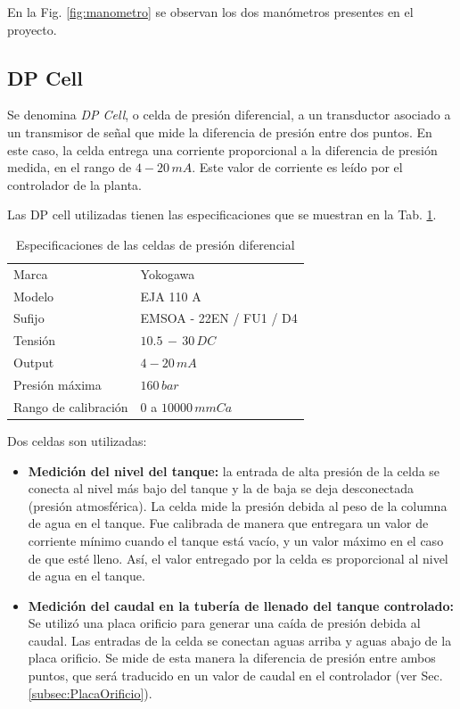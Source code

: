 En la Fig. \ref{fig:manometro} se observan los dos manómetros
presentes en el proyecto.

\subsection{DP Cell}
\label{subsec:DPCell}

Se denomina \textit{DP Cell}, o celda de presión diferencial, a un transductor
asociado a un transmisor de señal
que mide la diferencia de presión entre dos puntos.
En este caso, la celda entrega una corriente proporcional a la diferencia de
presión medida, en el rango de $4-20\,mA$.
Este valor de corriente es leído por el controlador de la planta.

Las DP cell utilizadas tienen las especificaciones que se muestran en la Tab.
\ref{tab:caractDPcell}.

\begin{table}[ht]
\renewcommand{\arraystretch}{1.3}
\centering
\begin{tabular}{|l|l|}
\hline
Marca & Yokogawa\\
Modelo & EJA 110 A\\
Sufijo & EMSOA - 22EN / FU1 / D4\\
Tensión & $10.5\,-\,30 \, DC$\\
Output & $4-20\,mA$\\
Presión máxima & $160\,bar$\\
Rango de calibración & $0$ a $10000\,mmCa$\\
\hline
\end{tabular}
\caption{Especificaciones de las celdas de presión diferencial}
\label{tab:caractDPcell}
\end{table}

Dos celdas son utilizadas:
\begin{itemize}
 \item \textbf{Medición del nivel del tanque:} la entrada de alta presión de la
celda
se conecta  al nivel más bajo del tanque y la de baja se deja desconectada
(presión atmosférica).
La celda mide la presión debida al peso de la columna de agua en el tanque.
Fue calibrada de manera que entregara un valor de corriente mínimo
cuando el tanque está vacío, y un valor máximo en el caso de que esté
lleno.
Así, el valor entregado por la celda es proporcional al nivel de
agua en el tanque.

\item \textbf{Medición del caudal en la tubería de llenado del tanque
controlado:}
Se utilizó una placa orificio para generar una caída de presión debida al
caudal.
Las entradas de la celda se conectan aguas arriba y aguas abajo
de la placa orificio.
Se mide de esta manera la diferencia de presión entre ambos puntos, que será
traducido en un valor de caudal en el
controlador (ver Sec. \ref{subsec:PlacaOrificio}).
\end{itemize}

